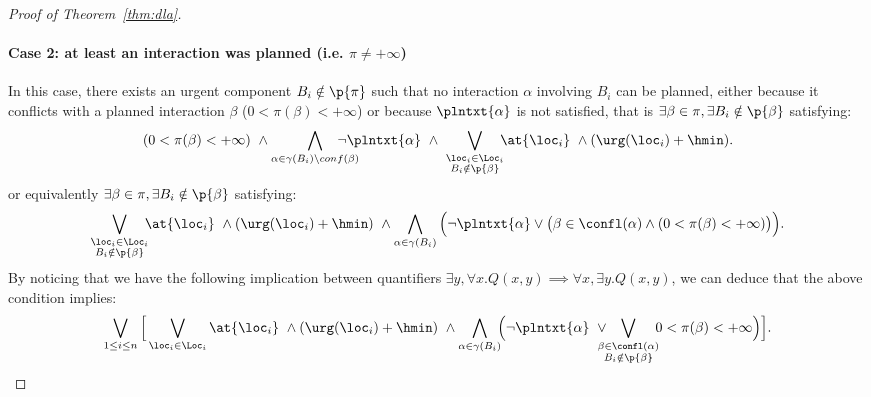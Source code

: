 \begin{proof}[Proof of Theorem~\ref{thm:dla}]
\paragraph*{Case 2: at least an interaction was planned (i.e. $\pi \neq +\infty$)\\}
In this case, there exists an urgent component $B_i \notin \p{\pi}$ such that no interaction $\alpha$ involving $B_i$ can be planned, either because
it conflicts with a planned interaction $\beta$ ($0<\pi(\beta)<+\infty$) or because $\plntxt{\alpha}$ is not satisfied, that is $\exists\beta\in\pi,\exists B_i\notin\p{\beta}$ satisfying:
\begin{displaymath}
  (0<\pi(\beta)<+\infty) \ \wedge\bigwedge_{\substack{\alpha \in \gamma(B_i) \setminus conf(\beta)}} \hspace*{-4ex} \neg\plntxt{\alpha} \ \wedge \ \bigvee_{\substack{\loc_i \in \Loc_i \\ B_i \notin \p{\beta}}} \hspace*{-1ex} \at{\loc_i} \ \wedge(\urg(\loc_i) + \hmin).
\end{displaymath}
or equivalently $\exists\beta\in\pi,\exists B_i\notin\p{\beta}$ satisfying:
\begin{displaymath}
  \bigvee_{\substack{\loc_i \in \Loc_i \\ B_i \notin \p{\beta}}} \hspace*{-1ex} \at{\loc_i} \ \wedge(\urg(\loc_i) + \hmin) \ \wedge\bigwedge_{\alpha \in \gamma(B_i) }
 \Big(\neg\plntxt{\alpha} \vee \big(\beta\in\confl(\alpha)\wedge (0<\pi(\beta)<+\infty)\big)\Big) .
\end{displaymath}
By noticing that we have the following implication between quantifiers 
$\exists y,\forall x. Q(x,y)\implies\forall x,\exists y. Q(x,y)$, we can deduce that the 
above condition implies:
\begin{displaymath}
  \bigvee_{1\le i\le n}\Big[\bigvee_{\loc_i \in \Loc_i}\at{\loc_i}\ \wedge(\urg(\loc_i)+\hmin) \ \wedge\bigwedge_{\alpha \in \gamma(B_i)}\hspace*{-1ex}\Big(  \neg\plntxt{\alpha} \
  \vee\hspace*{-2ex}\bigvee_{\substack{\beta\in\confl(\alpha)\\B_i\notin\p{\beta}}}\hspace*{-1ex}
0<\pi(\beta)<+\infty \Big)\Big].
\end{displaymath}



\end{proof}

